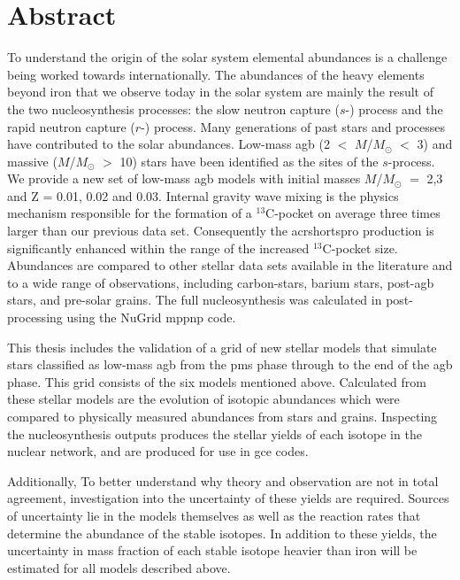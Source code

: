 \chapter{Abstract}

To understand the origin of the solar system elemental abundances is a challenge being worked towards internationally. The abundances of the heavy elements beyond iron that we observe today in the solar system are mainly the result of the two nucleosynthesis processes: the slow neutron capture ($s$-) process and the rapid neutron capture ($r$-) process. Many generations of past stars and processes have contributed to the solar abundances. Low-mass \acrfull{agb} (2 $<$ $M$/$M_\odot$ $<$ 3) and massive ($M$/$M_\odot$ $>$ 10) stars have been identified as the sites of the $s$-process. We provide a new set of low-mass \acrshort{agb} models with initial masses $M$/$M_\odot$ $=$ 2,3 and Z = 0.01, 0.02 and 0.03. Internal gravity wave mixing is the physics mechanism responsible for the formation of a $^{13}$C-pocket on average three times larger than our previous data set. Consequently the acrshort{spro} production is significantly enhanced within the range of the increased $^{13}$C-pocket size. Abundances are compared to other stellar data sets available in the literature and to a wide range of observations, including carbon-stars, barium stars, post-\acrshort{agb} stars, and pre-solar grains. The full nucleosynthesis was calculated in post-processing using the NuGrid mppnp code.

This thesis includes the validation of a grid of new stellar models that simulate stars classified as low-mass \acrshort{agb} from the \acrlong{pms} phase through to the end of the \acrshort{agb} phase. This grid consists of the six models mentioned above. Calculated from these stellar models are the evolution of isotopic abundances which were compared to physically measured abundances from stars and grains. Inspecting the nucleosynthesis outputs produces the stellar yields of each isotope in the nuclear network, and are produced for use in \acrfull{gce} codes. 

Additionally, To better understand why theory and observation are not in total agreement, investigation into the uncertainty of these yields are required. Sources of uncertainty lie in the models themselves as well as the reaction rates that determine the abundance of the stable isotopes. In addition to these yields, the uncertainty in mass fraction of each stable isotope heavier than iron will be estimated for all models described above.  
